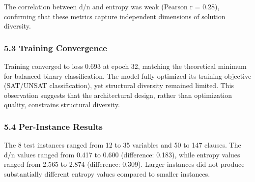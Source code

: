 The correlation between d/n and entropy was weak (Pearson r = 0.28), confirming that these metrics capture independent dimensions of solution diversity.

\subsubsection{5.3 Training Convergence}

Training converged to loss 0.693 at epoch 32, matching the theoretical minimum for balanced binary classification. The model fully optimized its training objective (SAT/UNSAT classification), yet structural diversity remained limited. This observation suggests that the architectural design, rather than optimization quality, constrains structural diversity.

\subsubsection{5.4 Per-Instance Results}

The 8 test instances ranged from 12 to 35 variables and 50 to 147 clauses. The d/n values ranged from 0.417 to 0.600 (difference: 0.183), while entropy values ranged from 2.565 to 2.874 (difference: 0.309). Larger instances did not produce substantially different entropy values compared to smaller instances.
